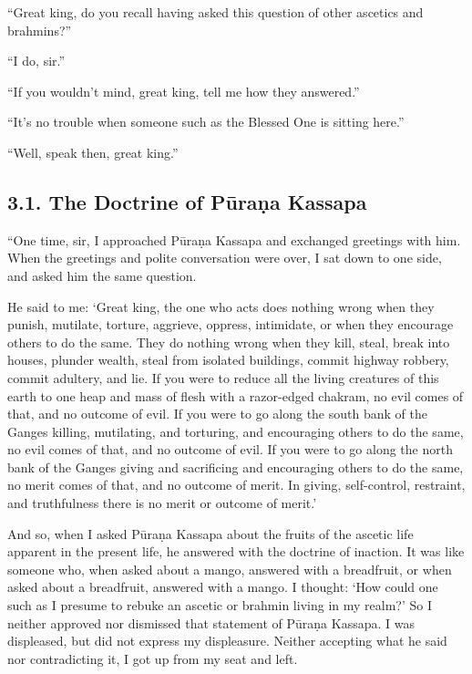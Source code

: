 \documentclass[12pt,openany]{book}%
\begin{document}
“Great king, do you recall having asked this question of other ascetics and brahmins?” 

“I do, sir.” 

“If you wouldn’t mind, great king, tell me how they answered.” 

“It’s no trouble when someone such as the Blessed One is sitting here.” 

“Well, speak then, great king.” 

\subsection*{3.1. The Doctrine of \textsanskrit{Pūraṇa} Kassapa }

“One time, sir, I approached \textsanskrit{Pūraṇa} Kassapa and exchanged greetings with him. When the greetings and polite conversation were over, I sat down to one side, and asked him the same question. 

He said to me: ‘Great king, the one who acts does nothing wrong when they punish, mutilate, torture, aggrieve, oppress, intimidate, or when they encourage others to do the same. They do nothing wrong when they kill, steal, break into houses, plunder wealth, steal from isolated buildings, commit highway robbery, commit adultery, and lie. If you were to reduce all the living creatures of this earth to one heap and mass of flesh with a razor-edged chakram, no evil comes of that, and no outcome of evil. If you were to go along the south bank of the Ganges killing, mutilating, and torturing, and encouraging others to do the same, no evil comes of that, and no outcome of evil. If you were to go along the north bank of the Ganges giving and sacrificing and encouraging others to do the same, no merit comes of that, and no outcome of merit. In giving, self-control, restraint, and truthfulness there is no merit or outcome of merit.’ 

And so, when I asked \textsanskrit{Pūraṇa} Kassapa about the fruits of the ascetic life apparent in the present life, he answered with the doctrine of inaction. It was like someone who, when asked about a mango, answered with a breadfruit, or when asked about a breadfruit, answered with a mango. I thought: ‘How could one such as I presume to rebuke an ascetic or brahmin living in my realm?’ So I neither approved nor dismissed that statement of \textsanskrit{Pūraṇa} Kassapa. I was displeased, but did not express my displeasure. Neither accepting what he said nor contradicting it, I got up from my seat and left. 
\end{document}
